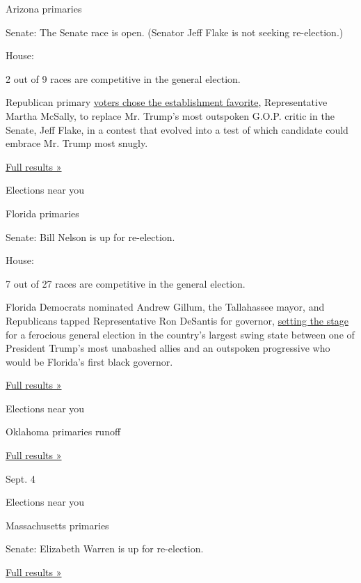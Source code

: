 Arizona primaries

Senate: The Senate race is open. (Senator Jeff Flake is not seeking
re-election.)

House:

2 out of 9 races are competitive in the general election.

Republican primary
\href{https://www.nytimes3xbfgragh.onion/2018/08/28/us/politics/florida-arizona-election-results.html}{voters
chose the establishment favorite}, Representative Martha McSally, to
replace Mr. Trump's most outspoken G.O.P. critic in the Senate, Jeff
Flake, in a contest that evolved into a test of which candidate could
embrace Mr. Trump most snugly.

\href{https://www.nytimes3xbfgragh.onion/interactive/2018/08/28/us/elections/arizona-primary-elections.html}{Full
results »}

Elections near you

Florida primaries

Senate: Bill Nelson is up for re-election.

House:

7 out of 27 races are competitive in the general election.

Florida Democrats nominated Andrew Gillum, the Tallahassee mayor, and
Republicans tapped Representative Ron DeSantis for governor,
\href{https://www.nytimes3xbfgragh.onion/2018/08/28/us/politics/florida-arizona-election-results.html}{setting
the stage} for a ferocious general election in the country's largest
swing state between one of President Trump's most unabashed allies and
an outspoken progressive who would be Florida's first black governor.

\href{https://www.nytimes3xbfgragh.onion/interactive/2018/08/28/us/elections/florida-primary-elections.html}{Full
results »}

Elections near you

Oklahoma primaries runoff

\href{https://www.nytimes3xbfgragh.onion/interactive/2018/08/28/us/elections/oklahoma-primary-runoff-elections.html}{Full
results »}

Sept. 4

Elections near you

Massachusetts primaries

Senate: Elizabeth Warren is up for re-election.

\href{https://www.nytimes3xbfgragh.onion/interactive/2018/09/04/us/elections/results-massachusetts-primary-elections.html}{Full
results »}

